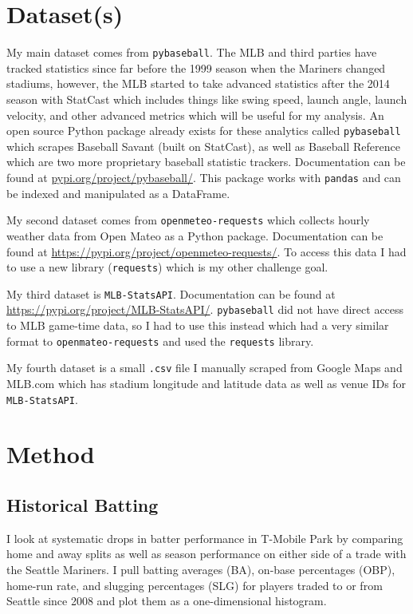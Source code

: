 \documentclass[11pt,twocolumn]{article}
\begin{document}
\section{Dataset(s)}
My main dataset comes from \texttt{pybaseball}. The MLB and third parties have tracked statistics since far before the 1999 season when the Mariners changed stadiums, however, the MLB started to take advanced statistics after the 2014 season with StatCast which includes things like swing speed, launch angle, launch velocity, and other advanced metrics which will be useful for my analysis. An open source Python package already exists for these analytics called \texttt{pybaseball} which scrapes Baseball Savant (built on StatCast), as well as Baseball Reference which are two more proprietary baseball statistic trackers. Documentation can be found at \url{pypi.org/project/pybaseball/}. This package works with \texttt{pandas} and can be indexed and manipulated as a DataFrame.

My second dataset comes from \texttt{openmeteo-requests} which collects hourly weather data from Open Mateo as a Python package. Documentation can be found at \url{https://pypi.org/project/openmeteo-requests/}. To access this data I had to use a new library (\texttt{requests}) which is my other challenge goal.

My third dataset is \texttt{MLB-StatsAPI}. Documentation can be found at \url{https://pypi.org/project/MLB-StatsAPI/}. \texttt{pybaseball} did not have direct access to MLB game-time data, so I had to use this instead which had a very similar format to \texttt{openmateo-requests} and used the \texttt{requests} library.

My fourth dataset is a small \texttt{.csv} file I manually scraped from Google Maps and MLB.com which has stadium longitude and latitude data as well as venue IDs for \texttt{MLB-StatsAPI}. 


\section{Method}

\subsection{Historical Batting}

I look at systematic drops in batter performance in T-Mobile Park by comparing home and away splits as well as season performance on either side of a trade with the Seattle Mariners. I pull batting averages (BA), on-base percentages (OBP), home-run rate, and slugging percentages (SLG) for players traded to or from Seattle since 2008 and plot them as a one-dimensional histogram.
\end{document}
